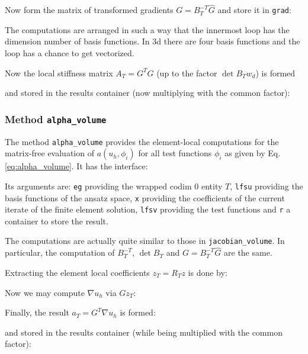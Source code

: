 \documentclass[a4paper,12pt]{article}
\begin{document}
Now form the matrix of transformed gradients $G=B_T^{-T} \hat G$ 
and store it in \lstinline{grad}:

The computations are arranged in such a way that the innermost loop
has the dimension number of basis functions. In 3d there are four basis functions
and the loop has a chance to get vectorized.

Now the local stiffness matrix $A_T = G^T G$ (up to the factor $\det B_T w_d$) is formed

and stored in the results container (now multiplying with the common factor):


\subsubsection*{Method \lstinline{alpha_volume}}

The method \lstinline{alpha_volume} provides the element-local computations
for the matrix-free evaluation of $a(u_h,\phi_i)$ for all test functions $\phi_i$
as given by Eq.\eqref{eq:alpha_volume}. It has the interface:

Its arguments are: \lstinline{eg} providing the wrapped codim 0 entity $T$,
\lstinline{lfsu} providing the basis functions of the ansatz space,
\lstinline{x} providing the coefficients of the current iterate 
of the finite element solution, \lstinline{lfsv} providing the test functions
and \lstinline{r} a container to store the result.

The computations are actually quite similar to those in \lstinline{jacobian_volume}.
In particular, the computation of $B_T^{-T}$, $\det B_T$ and $G = B_T^{-T} \hat G$
are the same.

Extracting the element local coefficients $z_T = R_T z$ is done by:

Now we may compute $\nabla u_h$ via $G z_T$:

Finally, the result $a_T = G^T \nabla u_h$ is formed:

and stored in the results container (while being multiplied with the common factor):

\end{document}
